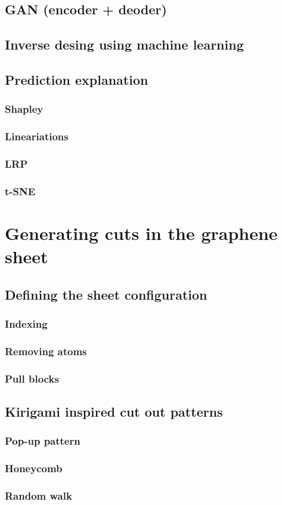 \subsection{GAN (encoder + deoder)}
\subsection{Inverse desing using machine learning}
\subsection{Prediction explanation}
\subsubsection{Shapley}
\subsubsection{Lineariations}
\subsubsection{LRP}
\subsubsection{t-SNE}



\section{Generating cuts in the graphene sheet}
\subsection{Defining the sheet configuration}
\subsubsection{Indexing}
\subsubsection{Removing atoms}
\subsubsection{Pull blocks}
\subsection{Kirigami inspired cut out patterns}
\subsubsection{Pop-up pattern}
\subsubsection{Honeycomb}
\subsubsection{Random walk}

